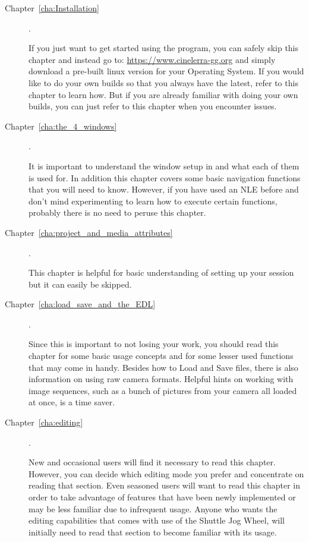 \begin{description}
    \item[Chapter~\ref{cha:Installation} ] .

        If you just want to get started using the program, you can safely skip this chapter and instead go to:
        {\small \url{https://www.cinelerra-gg.org}}
        and simply download a pre-built linux version for your Operating System. If you would like to do your own builds so that you always have the latest, refer to this chapter to learn how.
        But if you are already familiar with doing your own builds, you can just refer to this chapter when you encounter issues.
    \item[Chapter~\ref{cha:the_4_windows} ] .

        It is important to understand the window setup in \CGG{} and what each of them is used for.
        In addition this chapter covers some basic navigation functions that you will need to know.
        However, if you have used an NLE before and don’t mind experimenting to learn how to execute certain functions, probably there is no need to peruse this chapter.
    \item[Chapter~\ref{cha:project_and_media_attributes}] .

        This chapter is helpful for basic understanding of setting up your session but it can easily be skipped.

    \item[Chapter~\ref{cha:load_save_and_the_EDL}] .

        Since this is important to not losing your work, you should read this chapter for some basic usage concepts and for some lesser used functions that may come in handy.
        Besides how to Load and Save files, there is also information on using raw camera formats.
        Helpful hints on working with image sequences, such as a bunch of pictures from your camera all loaded at once, is a time saver.

    \item[Chapter~\ref{cha:editing}] .

        New and occasional users will find it necessary to read this chapter. However, you can decide which editing mode you prefer and concentrate on reading that section.
        Even seasoned users will want to read this chapter in order to take advantage of features that have been newly implemented or may be less familiar due to infrequent usage.
        Anyone who wants the editing capabilities that comes with use of the Shuttle Jog Wheel, will initially need to read that section to become familiar with its usage.


\end{description}
